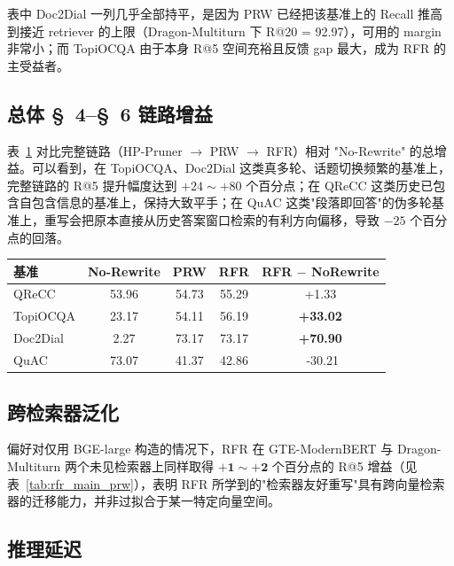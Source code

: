 表中 Doc2Dial 一列几乎全部持平，是因为 PRW 已经把该基准上的 Recall 推高到接近 retriever 的上限（Dragon-Multiturn 下 R@20 = 92.97），可用的 margin 非常小；而 TopiOCQA 由于本身 R@5 空间充裕且反馈 gap 最大，成为 RFR 的主受益者。

\subsection{总体 §~4--§~6 链路增益}

表~\ref{tab:chain_gain} 对比完整链路（HP-Pruner $\to$ PRW $\to$ RFR）相对 "No-Rewrite" 的总增益。可以看到，在 TopiOCQA、Doc2Dial 这类真多轮、话题切换频繁的基准上，完整链路的 R@5 提升幅度达到 $+24\sim+80$ 个百分点；在 QReCC 这类历史已包含自包含信息的基准上，保持大致平手；在 QuAC 这类"段落即回答"的伪多轮基准上，重写会把原本直接从历史答案窗口检索的有利方向偏移，导致 $-25$ 个百分点的回落。

\begin{table}[h]
\centering
{}
\label{tab:chain_gain}
\begin{tabular}{lcccc}
\toprule
基准 & No-Rewrite & PRW & RFR & RFR $-$ NoRewrite \\
\midrule
QReCC    & 53.96 & 54.73 & 55.29 & +1.33 \\
TopiOCQA & 23.17 & 54.11 & 56.19 & \textbf{+33.02} \\
Doc2Dial & 2.27 & 73.17 & 73.17 & \textbf{+70.90} \\
QuAC     & 73.07 & 41.37 & 42.86 & \,\,-30.21 \\
\bottomrule
\end{tabular}
\end{table}

\subsection{跨检索器泛化}

偏好对仅用 BGE-large 构造的情况下，RFR 在 GTE-ModernBERT 与 Dragon-Multiturn 两个未见检索器上同样取得 $\mathbf{+1\sim +2}$ 个百分点的 R@5 增益（见表~\ref{tab:rfr_main_prw}），表明 RFR 所学到的"检索器友好重写"具有跨向量检索器的迁移能力，并非过拟合于某一特定向量空间。

\subsection{推理延迟}

